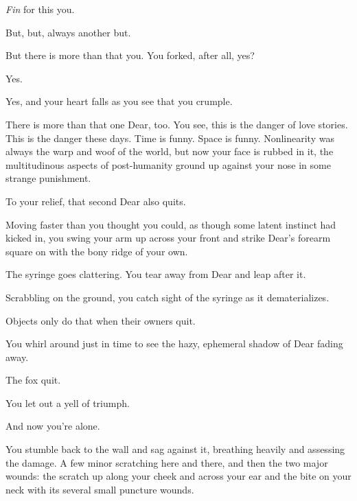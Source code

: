 \emph{Fin} for this you.

\vfill

\newpage

\null
\vfill

But, but, always another but.

But there is more than that you. You forked, after all, yes?

Yes.

Yes, and your heart falls as you see that you crumple.

There is more than that one Dear, too. You see, this is the danger of love stories. This is the danger these days. Time is funny. Space is funny. Nonlinearity was always the warp and woof of the world, but now your face is rubbed in it, the multitudinous aspects of post-humanity ground up against your nose in some strange punishment.

To your relief, that second Dear also quits.

Moving faster than you thought you could, as though some latent instinct had kicked in, you swing your arm up across your front and strike Dear's forearm square on with the bony ridge of your own.

The syringe goes clattering. You tear away from Dear and leap after it.

Scrabbling on the ground, you catch sight of the syringe as it dematerializes.

Objects only do that when their owners quit.

You whirl around just in time to see the hazy, ephemeral shadow of Dear fading away.

\vfill

\newpage

\null
\vfill

The fox quit.

\null
\vfill

\newpage

\null
\vfill

You let out a yell of triumph.

\null
\vfill

\newpage

\null
\vfill

And now you're alone.

\null
\vfill

\newpage

You stumble back to the wall and sag against it, breathing heavily and assessing the damage. A few minor scratching here and there, and then the two major wounds: the scratch up along your cheek and across your ear and the bite on your neck with its several small puncture wounds.

